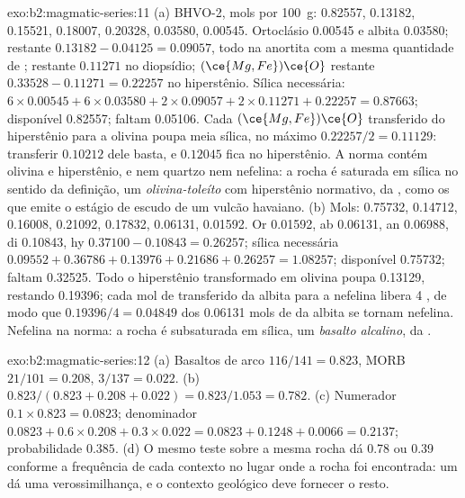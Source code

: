 \begin{solution}{exo:b2:magmatic-series:11}
(a) BHVO-2, mols por \qty{100}{g}:  0.82557,  0.13182, 
0.15521,  0.18007,  0.20328,  0.03580,  0.00545.
Ortoclásio 0.00545 e albita 0.03580;  restante $0.13182 - 0.04125 = 0.09057$,
todo na anortita com a mesma quantidade de ;  restante $0.11271$ no diopsídio;
$(\ce{Mg,Fe})\ce{O}$ restante $0.33528 - 0.11271 = 0.22257$ no hiperstênio. Sílica
necessária: $6\times0.00545 + 6\times0.03580 + 2\times0.09057 + 2\times0.11271 + 0.22257 =
0.87663$; disponível 0.82557; faltam 0.05106. Cada $(\ce{Mg,Fe})\ce{O}$ transferido do
hiperstênio para a olivina poupa meia sílica, no máximo $0.22257/2 = 0.11129$: transferir
$0.10212$ dele basta, e $0.12045$ fica no hiperstênio. A norma contém olivina
e hiperstênio, e nem quartzo nem nefelina: a rocha é saturada em sílica no
sentido da definição, um \emph{olivina-toleíto} com hiperstênio normativo, da
, como os que emite o estágio de escudo de um vulcão havaiano. (b) Mols: 0.75732, 0.14712, 0.16008, 0.21092, 0.17832, 0.06131,
0.01592. Or 0.01592, ab 0.06131, an 0.06988, di 0.10843, hy $0.37100 - 0.10843 =
0.26257$; sílica necessária $0.09552 + 0.36786 + 0.13976 + 0.21686 + 0.26257 = 1.08257$;
disponível 0.75732; faltam 0.32525. Todo o hiperstênio transformado em olivina poupa
0.13129, restando 0.19396; cada mol de  transferido da albita para a nefelina
libera 4 , de modo que $0.19396/4 = 0.04849$
dos 0.06131 mols de  da albita se tornam nefelina. Nefelina na norma: a
rocha é subsaturada em sílica, um \emph{basalto alcalino}, da .
\end{solution}

\begin{solution}{exo:b2:magmatic-series:12}
(a) Basaltos de arco $116/141 = 0.823$, MORB $21/101 = 0.208$, 
$3/137 = 0.022$. (b) $0.823/(0.823 + 0.208 + 0.022) = 0.823/1.053 = 0.782$.
(c) Numerador $0.1\times0.823 = 0.0823$; denominador $0.0823 + 0.6\times0.208 +
0.3\times0.022 = 0.0823 + 0.1248 + 0.0066 = 0.2137$; probabilidade $0.385$. (d) O
mesmo teste sobre a mesma rocha dá 0.78 ou 0.39 conforme a frequência de cada contexto
no lugar onde a rocha foi encontrada: um  dá uma verossimilhança, e o
contexto geológico deve fornecer o resto.
\end{solution}


